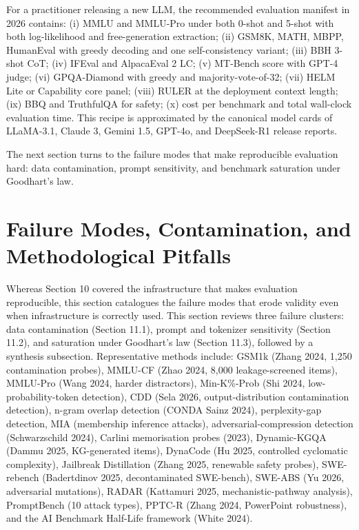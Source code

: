 For a practitioner releasing a new LLM, the recommended evaluation manifest in 2026 contains: (i) MMLU and MMLU-Pro under both 0-shot and 5-shot with both log-likelihood and free-generation extraction; (ii) GSM8K, MATH, MBPP, HumanEval with greedy decoding and one self-consistency variant; (iii) BBH 3-shot CoT; (iv) IFEval and AlpacaEval 2 LC; (v) MT-Bench score with GPT-4 judge; (vi) GPQA-Diamond with greedy and majority-vote-of-32; (vii) HELM Lite or Capability core panel; (viii) RULER at the deployment context length; (ix) BBQ and TruthfulQA for safety; (x) cost per benchmark and total wall-clock evaluation time. This recipe is approximated by the canonical model cards of LLaMA-3.1, Claude 3, Gemini 1.5, GPT-4o, and DeepSeek-R1 release reports.

The next section turns to the failure modes that make reproducible evaluation hard: data contamination, prompt sensitivity, and benchmark saturation under Goodhart's law.

\section{Failure Modes, Contamination, and Methodological Pitfalls}\label{failure-modes-contamination-and-methodological-pitfalls}

Whereas Section 10 covered the infrastructure that makes evaluation reproducible, this section catalogues the failure modes that erode validity even when infrastructure is correctly used. This section reviews three failure clusters: data contamination (Section 11.1), prompt and tokenizer sensitivity (Section 11.2), and saturation under Goodhart's law (Section 11.3), followed by a synthesis subsection. Representative methods include: GSM1k (Zhang 2024, 1,250 contamination probes), MMLU-CF (Zhao 2024, 8,000 leakage-screened items), MMLU-Pro (Wang 2024, harder distractors), Min-K\%-Prob (Shi 2024, low-probability-token detection), CDD (Sela 2026, output-distribution contamination detection), n-gram overlap detection (CONDA Sainz 2024), perplexity-gap detection, MIA (membership inference attacks), adversarial-compression detection (Schwarzschild 2024), Carlini memorisation probes (2023), Dynamic-KGQA (Dammu 2025, KG-generated items), DynaCode (Hu 2025, controlled cyclomatic complexity), Jailbreak Distillation (Zhang 2025, renewable safety probes), SWE-rebench (Badertdinov 2025, decontaminated SWE-bench), SWE-ABS (Yu 2026, adversarial mutations), RADAR (Kattamuri 2025, mechanistic-pathway analysis), PromptBench (10 attack types), PPTC-R (Zhang 2024, PowerPoint robustness), and the AI Benchmark Half-Life framework (White 2024).

